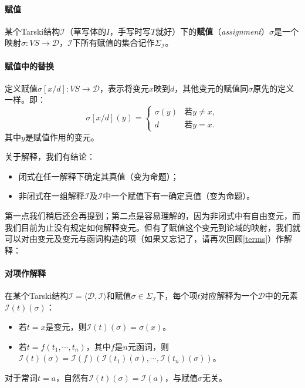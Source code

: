 \documentclass[b5paper,oneside]{ctexbook}
\begin{document}
\paragraph{赋值}某个Tarski结构$\mathscr{I}$（草写体的$I$，手写时写$T$就好）下的\textbf{赋值}（\textit{assignment}）$\sigma$是一个映射$\sigma:VS\to\mathcal D$，$\mathscr{I}$下所有赋值的集合记作$\Sigma_\mathscr{I}$。
\paragraph{赋值中的替换}定义赋值$\sigma [x/d]:VS\to \mathcal D$，表示将变元$x$映到$d$，其他变元的赋值同$\sigma$原先的定义一样。即：
\[\sigma [x/d](y)=\begin{cases}
\sigma(y)&\text{若}y\neq x,
\\d&\text{若}y=x.
\end{cases}\]
其中$y$是赋值作用的变元。

关于解释，我们有结论：
\begin{itemize}
\item 闭式在任一解释下确定其真值（变为命题）；
\item 非闭式在一组解释$\mathcal{I}$及$\mathscr{I}$中一个赋值下有一确定真值（变为命题）。
\end{itemize}

第一点我们稍后还会再提到；第二点是容易理解的，因为非闭式中有自由变元，而我们目前为止没有规定如何解释变元。但有了赋值这个变元到论域的映射，我们就可以对由变元及变元与函词构造的项（如果又忘记了，请再次回顾\ref{terms}）作解释：
\paragraph{对项作解释}在某个Tarski结构$\mathscr{I}=\langle\mathcal D,\mathcal I\rangle$和赋值$\sigma\in\Sigma_\mathscr I$下，每个项$t$对应解释为一个$\mathcal D$中的元素$\mathscr I(t)(\sigma)$：
\begin{itemize}
\item 若$t=x$是变元，则$\mathscr I(t)(\sigma)=\sigma(x)$。
\item 若$t=f(t_1,\cdots ,t_n)$，其中$f$是$n$元函词，则$\mathscr I(t)(\sigma)=\mathcal{I}(f)(\mathscr I(t_1)(\sigma),\cdots ,\mathscr I(t_n)(\sigma))$。
\end{itemize}
对于常词$t=a$，自然有$\mathscr I(t)(\sigma)=\mathcal{I}(a)$，与赋值$\sigma$无关。
\end{document}
